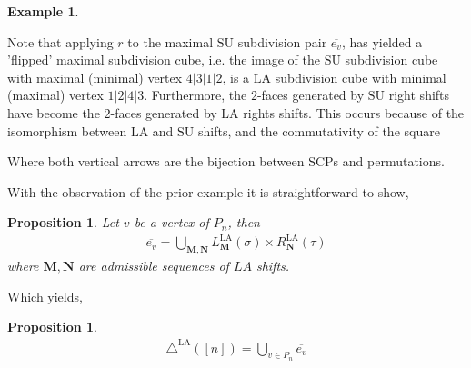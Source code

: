 \documentclass{amsart}
\newcommand{\red}{\color{red}} %
\newtheorem{proposition}[theorem]{Proposition}
\theoremstyle{definition}
\newtheorem{example}[theorem]{Example}
\newcommand{\SU}{\mathrm{SU}}
\newcommand{\LA}{\mathrm{LA}}
\newcommand{\LAD}{\triangle^{\mathrm{LA}}}
\newcommand{\maxsubdivpairsv}{\overline{e_v}}
\begin{document}
\begin{example}
\begin{center}
{
}
\end{center}
Note that applying $r$ to the maximal $\SU$ subdivision pair $\maxsubdivpairsv$, has yielded a 'flipped' maximal subdivision cube, i.e. the image of the $\SU$ subdivision cube with maximal (minimal) vertex $4|3|1|2$, is a $\LA$ subdivision cube with minimal (maximal) vertex $1|2|4|3$. 
Furthermore, the $2$-faces generated by $\SU$ right shifts have become the $2$-faces generated by $\LA$ rights shifts.
This occurs because of the isomorphism between $\LA$ and $\SU$ shifts, and the commutativity of the square 
\begin{center}
\end{center}
Where both vertical arrows are the bijection between SCPs and permutations.
\end{example}

With the observation of the prior example it is straightforward to show,

\begin{proposition}
Let $v$ be a vertex of $P_n$, then
\begin{align*}
    \maxsubdivpairsv = \bigcup_{\mathbf{M},\mathbf{N}} L_\mathbf{M}^{\LA}(\sigma) \times R_{\mathbf{N}}^{\LA}(\tau)
\end{align*}
where $\mathbf{M},\mathbf{N}$ are admissible sequences of $LA$ shifts.
\end{proposition}

Which yields,
\begin{proposition}
\begin{align*}
    \LAD([n]) = \bigcup_{v \in P_n} \maxsubdivpairsv
\end{align*}
\end{proposition}
\end{document}
